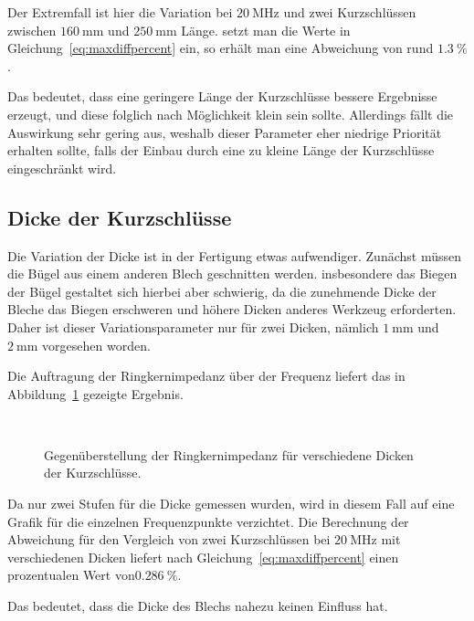 \par
Der Extremfall ist hier die Variation bei $\SI{20}{\mega\hertz}$ und zwei Kurzschl\"ussen zwischen $\SI{160}{\milli\meter}$ und $\SI{250}{\milli\meter}$ L\"ange. setzt man die Werte in Gleichung~\ref{eq:maxdiffpercent} ein, so erh\"alt man eine Abweichung von rund $\SI{1,3}{\%}$. 
\par
Das bedeutet, dass eine geringere L\"ange der Kurzschl\"usse bessere Ergebnisse erzeugt, und diese folglich nach M\"oglichkeit klein sein sollte. Allerdings f\"allt die Auswirkung sehr gering aus, weshalb dieser Parameter eher niedrige Priorit\"at erhalten sollte, falls der Einbau durch eine zu kleine L\"ange der Kurzschl\"usse eingeschr\"ankt wird.

\subsection{Dicke der Kurzschl\"usse}
Die Variation der Dicke ist in der Fertigung etwas aufwendiger. Zun\"achst m\"ussen die B\"ugel aus einem anderen Blech geschnitten werden. insbesondere das Biegen der B\"ugel gestaltet sich hierbei aber schwierig, da die zunehmende Dicke der Bleche das Biegen erschweren und h\"ohere Dicken anderes Werkzeug erforderten. Daher ist dieser Variationsparameter nur f\"ur zwei Dicken, n\"amlich $\SI{1}{\milli\meter}$ und $\SI{2}{\milli\meter}$ vorgesehen worden.
\par
Die Auftragung der Ringkernimpedanz \"uber der Frequenz liefert das in Abbildung~\ref{fig:ringcorethick} gezeigte Ergebnis.
\begin{figure}[htb]
	\centering
	\\
	\caption{Gegen\"uberstellung der Ringkernimpedanz f\"ur verschiedene Dicken der Kurzschl\"usse.}
	\label{fig:ringcorethick}
\end{figure}
\par
Da nur zwei Stufen f\"ur die Dicke gemessen wurden, wird in diesem Fall auf eine Grafik f\"ur die einzelnen Frequenzpunkte verzichtet. Die Berechnung der Abweichung f\"ur den Vergleich von zwei Kurzschl\"ussen bei $\SI{20}{\mega\hertz}$ mit verschiedenen Dicken liefert nach Gleichung~\ref{eq:maxdiffpercent} einen prozentualen Wert von$\SI{0,286}{\%}$. 
\par
Das bedeutet, dass die Dicke des Blechs nahezu keinen Einfluss hat.
